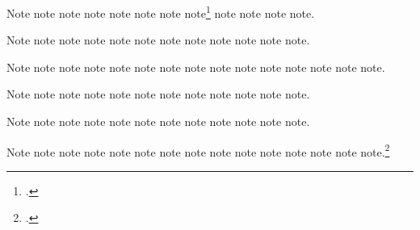 \documentclass[a4paper,12pt]{report}
\begin{document}
Note\autocite{loften:hamlet} note\autocite{maisonneuve:relations}
note\autocite{lippincott:chicago} note\autocite{loften:hamlet}
note\autocite{mchugh:wake} note\autocite{mcmillen:antebellum}
note\autocite{maisonneuve:relations}
note\footnote{.}
note\autocite{mchugh:wake} note\autocite[6.9.4]{mla:style}
note\autocite{morgenson:market} note\autocite{mozart:figaro}.

Note\autocite{murphy:silent} note\autocite{nasa:db}
note\autocite{nass:address} note\autocite{mcmillen:antebellum}
note\autocite{natrecoff:camera} note\autocite[2:25]{meredith:letters}
note\autocite[6.9.5]{mla:style} note\autocite{morgenson:market}
note\autocite{murphy:silent} note\autocite{mozart:figaro}
note\autocite{nasa:db} note\autocite{nass:address}.

Note\autocite{nyt:obittrevor} note\autocite{nyt:trevorobit}
note\autocite{nytrumpet:art} note\autocite{osborne:poison}
note\autocite{oed:cdrom} note\autocite{natrecoff:camera}
note\autocite{palmatary:pottery} note\autocite{nyt:obittrevor}
note\autocite{nyt:trevorobit} note\autocite[arithmetical]{oed:cdrom}
note\autocite{nytrumpet:art} note\autocite{pelikan:christian}
note\autocite{petroff:impurity} note\autocite{osborne:poison}
note\autocite{phibbs:diary}.

Note\autocite{palmatary:pottery} note\autocite{pirumova}
note\autocite{pelikan:christian} note\autocite{petroff:impurity}
note\autocite{plato:republic:gr} note\autocite{polakow:afterw}
note\autocite{phibbs:diary}
note\autocite[360e--361b]{plato:republic:gr} note\autocite{pirumova}
note\autocite{polakow:afterw} note\autocite{pollan:plant}
note\autocite{powell:email}.

Note\autocite{prose:intro} note\autocite{ratliff:review}
note\autocite{reaves:rosen} note\autocite{pollan:plant}
note\autocite{powell:email} note\autocite{prose:intro}
note\autocite{rodman:walk} note\autocite{roosevelt:speech}
note\autocite{ross:thesis} note\autocite{ratliff:review}
note\autocite{rozner:liberation} note\autocite{rubinstein:chopin}.

Note\autocite{schellinger:novel} note\autocite{reaves:rosen}
note\autocite{schubert:muellerin} note\autocite{rodman:walk}
note\autocite{schweitzer:bach} note\autocite{roosevelt:speech}
note\autocite{ross:thesis} note\autocite{rozner:liberation}
note\autocite{rubinstein:chopin} note\autocite{sechzer:women}
note\autocite{schellinger:novel} note\autocite{sereny:cries}
note\autocite{schubert:muellerin} note\autocite{schweitzer:bach}
note.\footnote{.}
\end{document}
